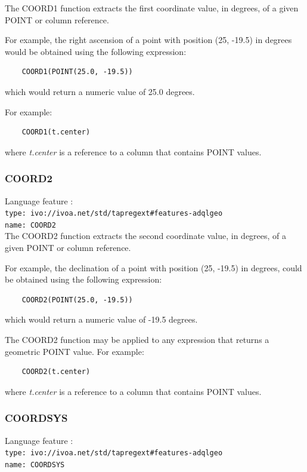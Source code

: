 \documentclass[11pt,a4paper]{ivoa}
\begin{document}
The COORD1 function extracts the first coordinate value, in degrees, of a given
POINT  or column reference.

For example, the right ascension of a point with position (25, -19.5) in
degrees would be obtained using the following expression:
\begin{verbatim}
    COORD1(POINT(25.0, -19.5))
\end{verbatim}
\noindent
which would return a numeric value of 25.0 degrees.

For example:
\begin{verbatim}
    COORD1(t.center)
\end{verbatim}
\noindent
where \textit{t.center} is a reference to a column that contains POINT values.

\subsubsection{COORD2}
\label{sec:functions.geom.coord2}
{\footnotesize Language feature :}\\
{\footnotesize \verb|type: ivo://ivoa.net/std/tapregext#features-adqlgeo|}\\
{\footnotesize \verb|name: COORD2|}\\

The COORD2 function extracts the second coordinate value, in degrees, of a given
POINT  or column reference.

For example, the declination of a point with position (25, -19.5) in degrees,
could be obtained using the following expression:
\begin{verbatim}
    COORD2(POINT(25.0, -19.5))
\end{verbatim}
\noindent
which would return a numeric value of -19.5 degrees.

The COORD2 function may be applied to any expression that returns a
geometric POINT value.
For example:
\begin{verbatim}
    COORD2(t.center)
\end{verbatim}
\noindent
where \textit{t.center} is a reference to a column that contains POINT values.

\subsubsection{COORDSYS}
\label{sec:functions.geom.coordsys}
{\footnotesize Language feature :}\\
{\footnotesize \verb|type: ivo://ivoa.net/std/tapregext#features-adqlgeo|}\\
{\footnotesize \verb|name: COORDSYS|}\\
\end{document}
